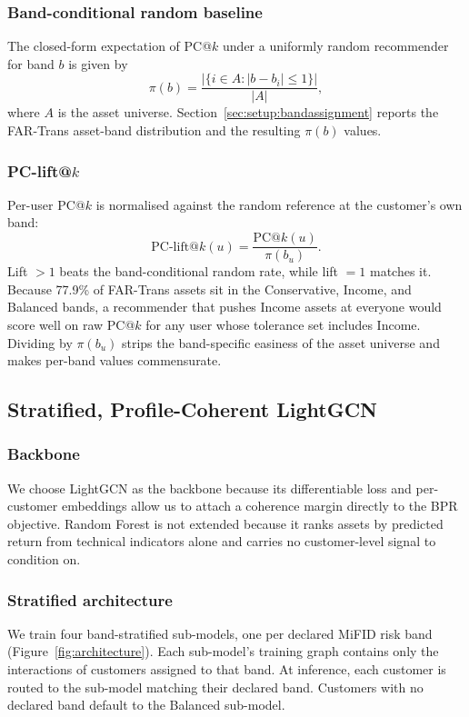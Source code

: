 \subsubsection{Band-conditional random baseline}
The closed-form expectation of PC@$k$ under a uniformly random recommender for band $b$ is given by
\begin{equation}
\pi(b) = \frac{|\{ i \in A : |b - b_i| \leq 1 \}|}{|A|},
\end{equation}
where $A$ is the asset universe. Section~\ref{sec:setup:bandassignment} reports the FAR-Trans asset-band distribution and the resulting $\pi(b)$ values.

\subsubsection{PC-lift@$k$}
Per-user PC@$k$ is normalised against the random reference at the customer's own band:
\begin{equation}
\text{PC-lift@}k(u) = \frac{\text{PC@}k(u)}{\pi(b_u)}.
\end{equation}
Lift $> 1$ beats the band-conditional random rate, while lift $= 1$ matches it. Because 77.9\% of FAR-Trans assets sit in the Conservative, Income, and Balanced bands, a recommender that pushes Income assets at everyone would score well on raw PC@$k$ for any user whose tolerance set includes Income. Dividing by $\pi(b_u)$ strips the band-specific easiness of the asset universe and makes per-band values commensurate.

\subsection{Stratified, Profile-Coherent LightGCN}
\label{sec:method:pclgcn}

\subsubsection{Backbone}
We choose LightGCN as the backbone because its differentiable loss and per-customer embeddings allow us to attach a coherence margin directly to the BPR objective. Random Forest is not extended because it ranks assets by predicted return from technical indicators alone and carries no customer-level signal to condition on.

\subsubsection{Stratified architecture}
We train four band-stratified sub-models, one per declared MiFID risk band (Figure~\ref{fig:architecture}). Each sub-model's training graph contains only the interactions of customers assigned to that band. At inference, each customer is routed to the sub-model matching their declared band. Customers with no declared band default to the Balanced sub-model.

